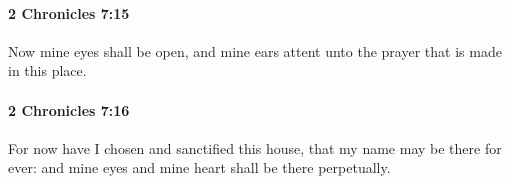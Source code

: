 		\paragraph{2 Chronicles 7:15} %
			\label{2CHRONICLES-7-15}

			Now mine eyes shall be open, and mine ears attent unto the prayer that is made in this place.


		\paragraph{2 Chronicles 7:16} %
			\label{2CHRONICLES-7-16}

			For now have I chosen and sanctified this house, that my name may be there for ever: and mine eyes and mine heart shall be there perpetually.


